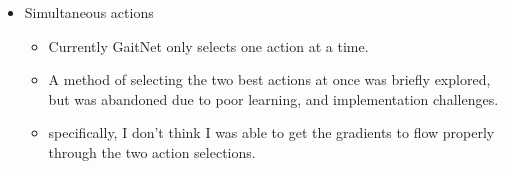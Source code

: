 \begin{itemize}
  \item Simultaneous actions
    \begin{itemize}
      \item Currently GaitNet only selects one action at a time.
      \item A method of selecting the two best actions at once was
        briefly explored, but was abandoned due to poor learning,
        and implementation challenges.
      \item specifically, I don't think I was able to get the gradients
        to flow properly through the two action selections.
    \end{itemize}
\end{itemize}
